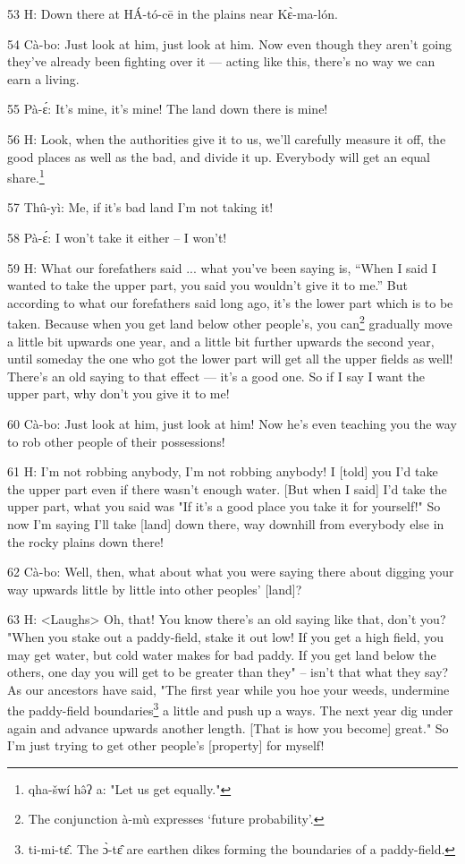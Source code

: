 53 H: Down there at HÁ-tó-cē in the plains near Kɛ̀-ma-lón.

54 Cà-bo: Just look at him, just look at him. Now even though they aren't going
they've already been fighting over it --- acting like this, there's no way we can
earn a living.

55 Pà-ɛ́: It's mine, it's mine! The land down there is mine!

56 H: Look, when the authorities give it to us, we'll carefully measure it off,
the good places as well as the bad, and divide it up. Everybody will get an equal
share.\footnote{qha-šwí hə̂ʔ a: "Let us get equally."}

57 Thû-yì: Me, if it's bad land I'm not taking it!

58 Pà-ɛ́: I won't take it either -- I won't!

59 H: What our forefathers said ... what you've been saying is, ``When I said I
wanted to take the upper part, you said you wouldn't give it to me.'' But according
to what our forefathers said long ago, it's the lower part which is to be taken.
Because when you get land below other people's, you can\footnote{The conjunction à-mù expresses `future probability'.} gradually move a little
bit upwards one year, and a little bit further upwards the second year, until someday
the one who got the lower part will get all the upper fields as well! There's an
old saying to that effect --- it's a good one. So if I say I want the upper part,
why don't you give it to me!

60 Cà-bo: Just look at him, just look at him! Now he's even teaching you the way
to rob other people of their possessions!

61 H: I'm not robbing anybody, I'm not robbing anybody! I [told] you I'd take the
upper part even if there wasn't enough water. [But when I said] I'd take the upper
part, what you said was "If it's a good place you take it for yourself!"
So now I'm saying I'll take [land] down there, way downhill from everybody else
in the rocky plains down there!

62 Cà-bo: Well, then, what about what you were saying there about digging your
way upwards little by little into other peoples' [land]?

63 H: <Laughs> Oh, that! You know there's an old saying like
that, don't you? "When you stake out a paddy-field, stake it out low!
If you get a high field, you may get water, but cold water makes for bad paddy.
If you get land below the others, one day you will get to be greater than they"
-- isn't that what they say? As our ancestors have said, "The first year
while you hoe your weeds, undermine the paddy-field boundaries\footnote{ti-mi-tɛ̂. The ɔ̀-tɛ̂ are earthen dikes forming the boundaries of a paddy-field.} a little and
push up a ways. The next year dig under again and advance upwards another length.
[That is how you become] great." So I'm just trying to get other people's
[property] for myself!

